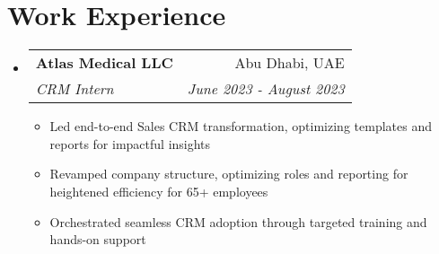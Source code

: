 \documentclass[a4paper,20pt]{article}
\makeatletter
\newcommand{\resumeItemWithoutTitle}[1] {
	\item\small{
		{#1 \vspace{-2pt}}
	}
}
\newcommand{\resumeSubheading}[4] {
	\vspace{-1pt}\item
	\begin{tabular*}{0.97\textwidth}{l@{\extracolsep{\fill}}r}
		\textbf{#1} & #2 \\
		\textit{#3} & \textit{#4} \\
	\end{tabular*}\vspace{-5pt}
}
\newcommand{\resumeSubHeadingListStart}{\begin{itemize}[leftmargin=*]}
\newcommand{\resumeSubHeadingListEnd}{\end{itemize}}
\newcommand{\resumeItemListStart}{\begin{itemize}}
\newcommand{\resumeItemListEnd}{\end{itemize}\vspace{-5pt}}
\makeatother
\begin{document}

\vspace{-5pt}
\section{Work Experience}
	\resumeSubHeadingListStart
		\resumeSubheading{Atlas Medical LLC}{Abu Dhabi, UAE} {CRM Intern}{June 2023 - August 2023}
		\resumeItemListStart
			\resumeItemWithoutTitle{Led end-to-end Sales CRM transformation, optimizing templates and reports for impactful insights}
			\resumeItemWithoutTitle{Revamped company structure, optimizing roles and reporting for heightened efficiency for 65+ employees}
			\resumeItemWithoutTitle{Orchestrated seamless CRM adoption through targeted training and hands-on support}
		\resumeItemListEnd
	\resumeSubHeadingListEnd
\end{document}
